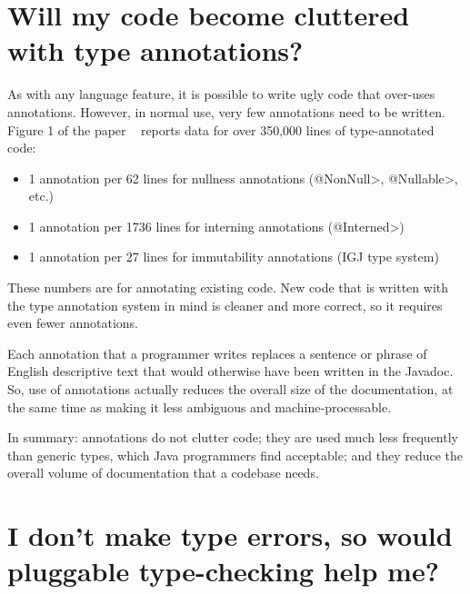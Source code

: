 \section{Will my code become cluttered with type annotations?\label{faq-code-clutter}}


As with any language feature, it is possible to write ugly code that
over-uses annotations.  However, in normal use, very few annotations need
to be written.  Figure 1 of the paper
~\cite{PapiACPE2008} reports data for over
350,000 lines of type-annotated code:

\begin{itemize}
\item
    1 annotation per 62 lines for nullness annotations (\<@NonNull>, \<@Nullable>, etc.)
\item
    1 annotation per 1736 lines for interning annotations (\<@Interned>)
\item
    1 annotation per 27 lines for immutability annotations (IGJ type system)
\end{itemize}

These numbers are for annotating existing code.  New code that
is written with the type annotation system in mind is cleaner and more
correct, so it requires even fewer annotations.

Each annotation that a programmer writes replaces a sentence or phrase of
English descriptive text that would otherwise have been written in the
Javadoc.  So, use of annotations actually reduces the overall size of the
documentation, at the same time as making it less ambiguous and
machine-processable.

In summary:  annotations do not clutter code; they are used much
less frequently than generic types, which Java programmers find acceptable;
and they reduce the overall volume of documentation that a codebase needs.


\section{I don't make type errors, so would pluggable type-checking help me?\label{never-make-type-errors}}

